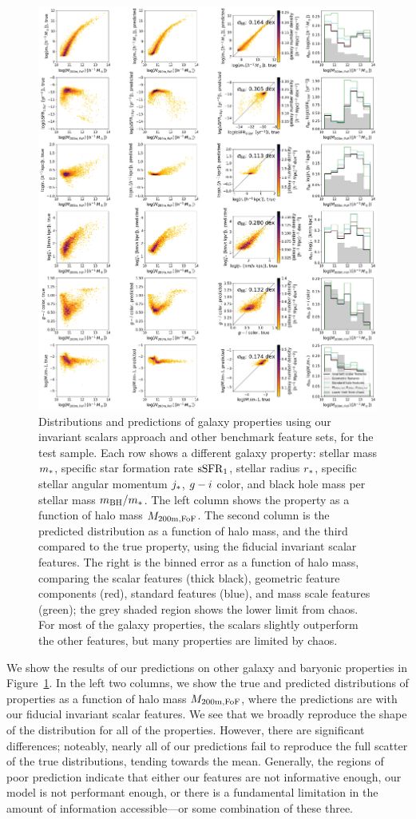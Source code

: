 \begin{figure}
    \centering
    \includegraphics[width=0.8\columnwidth]{pred_galprops.png}
    \caption{Distributions and predictions of galaxy properties using our invariant scalars approach and other benchmark feature sets, for the test sample. 
    Each row shows a different galaxy property: stellar mass $m_*$, specific star formation rate $\mathrm{sSFR}_1$, stellar radius $r_*$, specific stellar angular momentum $j_*$, $g-i$ color, and black hole mass per stellar mass $m_\mathrm{BH}/m_*$. 
    The left column shows the property as a function of halo mass $M_\mathrm{200m,FoF}$. 
    The second column is the predicted distribution as a function of halo mass, and the third compared to the true property, using the fiducial invariant scalar features.
    The right is the binned error as a function of halo mass, comparing the scalar features (thick black), geometric feature components (red), standard features (blue), and mass scale features (green); the grey shaded region shows the lower limit from chaos.
    For most of the galaxy properties, the scalars slightly outperform the other features, but many properties are limited by chaos.
    }
    \label{fig:galprops}
\end{figure}

We show the results of our predictions on other galaxy and baryonic properties in Figure~\ref{fig:galprops}.
In the left two columns, we show the true and predicted distributions of properties as a function of halo mass $M_\mathrm{200m,FoF}$, where the predictions are with our fiducial invariant scalar features.
We see that we broadly reproduce the shape of the distribution for all of the properties. 
However, there are significant differences; noteably, nearly all of our predictions fail to reproduce the full scatter of the true distributions, tending towards the mean.
Generally, the regions of poor prediction indicate that either our features are not informative enough, our model is not performant enough, or there is a fundamental limitation in the amount of information accessible---or some combination of these three.

